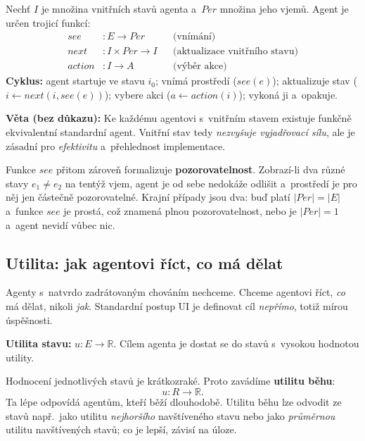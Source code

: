 \documentclass[11pt,a4paper]{article}
\theoremstyle{definition}
\begin{document}
\begin{defbox}
Nechť $I$ je množina vnitřních stavů agenta a~$\mathit{Per}$ množina jeho vjemů. Agent je určen trojicí funkcí:
\begin{align*}
\mathit{see} &: E \to \mathit{Per} && \text{(vnímání)}\\
\mathit{next} &: I \times \mathit{Per} \to I && \text{(aktualizace vnitřního stavu)}\\
\mathit{action} &: I \to A && \text{(výběr akce)}
\end{align*}
\textbf{Cyklus:} agent startuje ve stavu $i_0$; vnímá prostředí ($\mathit{see}(e)$); aktualizuje
stav ($i \leftarrow \mathit{next}(i, \mathit{see}(e))$); vybere akci ($a \leftarrow \mathit{action}(i)$);
vykoná ji a~opakuje.

\textbf{Věta (bez důkazu):} Ke každému agentovi s~vnitřním stavem existuje funkčně ekvivalentní
standardní agent. Vnitřní stav tedy \emph{nezvyšuje vyjadřovací sílu}, ale je zásadní pro
\emph{efektivitu} a~přehlednost implementace.
\end{defbox}

Funkce $\mathit{see}$ přitom zároveň formalizuje \textbf{pozorovatelnost}. Zobrazí-li dva různé
stavy $e_1 \ne e_2$ na tentýž vjem, agent je od sebe nedokáže odlišit a~prostředí je pro něj jen
částečně pozorovatelné. Krajní případy jsou dva: buď platí $|\mathit{Per}| = |E|$ a~funkce
$\mathit{see}$ je prostá, což znamená plnou pozorovatelnost, nebo je $|\mathit{Per}| = 1$
a~agent nevidí vůbec nic.

\subsection{Utilita: jak agentovi říct, co má dělat}

Agenty s~natvrdo zadrátovaným chováním nechceme. Chceme agentovi říct, \emph{co} má dělat,
nikoli \emph{jak}. Standardní postup UI je definovat cíl \emph{nepřímo}, totiž mírou úspěšnosti.

\begin{defbox}[Utilita]
\textbf{Utilita stavu:} $u : E \to \mathbb{R}$. Cílem agenta je dostat se do stavů s~vysokou
hodnotou utility.

Hodnocení jednotlivých stavů je krátkozraké. Proto zavádíme \textbf{utilitu běhu}:
\[
u : R \to \mathbb{R} .
\]
Ta lépe odpovídá agentům, kteří běží dlouhodobě. Utilitu běhu lze odvodit ze stavů např.\ jako
utilitu \emph{nejhoršího} navštíveného stavu nebo jako \emph{průměrnou} utilitu navštívených
stavů; co je lepší, závisí na úloze.
\end{defbox}
\end{document}
